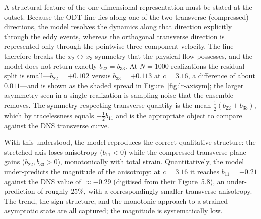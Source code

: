 \documentclass[lineno]{JFM-FLM_Au}
\begin{document}
A structural feature of the one-dimensional representation must be stated at the
outset. Because the ODT line lies along one of the two transverse (compressed)
directions, the model resolves the dynamics along that direction explicitly
through the eddy events, whereas the orthogonal transverse direction is
represented only through the pointwise three-component velocity. The line
therefore breaks the $x_2\leftrightarrow x_3$ symmetry that the physical flow
possesses, and the model does not return exactly $b_{22}=b_{33}$. At $N=1000$
realizations the residual split is small---$b_{22}=+0.102$ versus
$b_{33}=+0.113$ at $c=3.16$, a difference of about $0.011$---and is shown as the
shaded spread in Figure~\ref{fig:lr-axisym}; the larger asymmetry seen in a
single realization is sampling noise that the ensemble removes. The
symmetry-respecting transverse quantity is the mean
$\tfrac{1}{2}(b_{22}+b_{33})$, which by tracelessness equals $-\tfrac{1}{2}b_{11}$
and is the appropriate object to compare against the DNS transverse curve.

With this understood, the model reproduces the correct qualitative structure: the
stretched axis loses anisotropy ($b_{11}<0$) while the compressed transverse
plane gains ($b_{22},b_{33}>0$), monotonically with total strain. Quantitatively,
the model under-predicts the magnitude of the anisotropy: at $c=3.16$ it reaches
$b_{11}=-0.21$ against the DNS value of $\approx-0.29$ (digitised from their
Figure~5.8), an under-prediction of roughly $25\%$, with a correspondingly
smaller transverse anisotropy. The trend, the sign structure, and the monotonic
approach to a strained asymptotic state are all captured; the magnitude is
systematically low.
\end{document}
